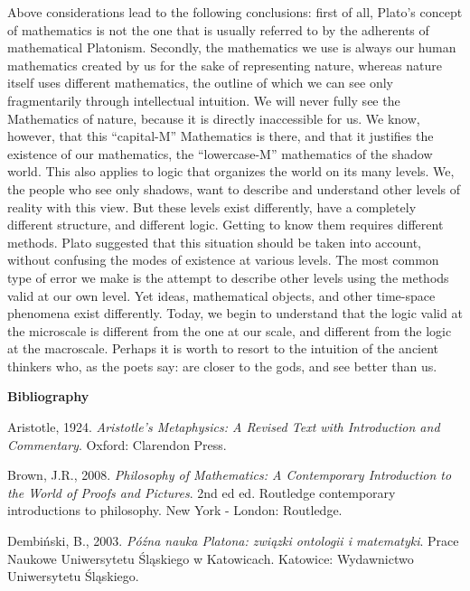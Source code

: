 \documentclass[a4paper]{article}
\begin{document}
Above considerations lead to the following conclusions: first of all, Plato’s concept of mathematics is not the one that
is usually referred to by the adherents of mathematical Platonism. Secondly, the mathematics we use is always our human
mathematics created by us for the sake of representing nature, whereas nature itself uses different mathematics, the
outline of which we can see only fragmentarily through intellectual intuition. We will never fully see the Mathematics
of nature, because it is directly inaccessible for us. We know, however, that this “capital-M” Mathematics is there,
and that it justifies the existence of our mathematics, the “lowercase-M” mathematics of the shadow world. This also
applies to logic that organizes the world on its many levels. We, the people who see only shadows, want to describe and
understand other levels of reality with this view. But these levels exist differently, have a completely different
structure, and different logic. Getting to know them requires different methods. Plato suggested that this situation
should be taken into account, without confusing the %
modes of existence at various levels. The most common type of error we make is the attempt to describe other levels
using the methods valid at our own level.  Yet ideas, mathematical objects, and other time-space phenomena %
exist differently. %
Today, we begin to understand that the logic valid at the microscale is different from the one at our scale, and
different from the logic at the macroscale. Perhaps it is worth to resort to the intuition of the ancient thinkers who,
as the poets say: are closer to the gods, and see better than us. 

{\bfseries
Bibliography}

Aristotle, 1924. \textit{Aristotle’s Metaphysics: A Revised Text with Introduction and Commentary}. Oxford: Clarendon
Press.

Brown, J.R., 2008. \textit{Philosophy of Mathematics: A Contemporary Introduction to the World of Proofs and Pictures}.
2nd ed ed. Routledge contemporary introductions to philosophy. New York - London: Routledge.

Dembiński, B., 2003. \textit{Późna nauka Platona: związki ontologii i matematyki}. Prace Naukowe Uniwersytetu Śląskiego
w Katowicach. Katowice: Wydawnictwo Uniwersytetu Śląskiego.
\end{document}
